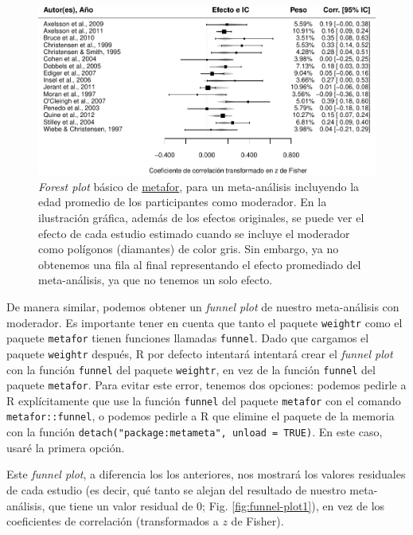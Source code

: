 \documentclass[
  bookmarksnumbered]{article}
\begin{document}
\begin{figure}
\centering
\includegraphics{Meta-analysis_files/figure-latex/for-plot-mod1-1.pdf}
\caption{\label{fig:for-plot-mod1}\emph{Forest plot} básico de \href{https://www.metafor-project.org/doku.php}{metafor}, para un meta-análisis incluyendo la edad promedio de los participantes como moderador. En la ilustración gráfica, además de los efectos originales, se puede ver el efecto de cada estudio estimado cuando se incluye el moderador como polígonos (diamantes) de color gris. Sin embargo, ya no obtenemos una fila al final representando el efecto promediado del meta-análisis, ya que no tenemos un solo efecto.}
\end{figure}

De manera similar, podemos obtener un \emph{funnel plot} de nuestro meta-análisis con moderador. Es importante tener en cuenta que tanto el paquete \texttt{weightr} como el paquete \texttt{metafor} tienen funciones llamadas \texttt{funnel}. Dado que cargamos el paquete \texttt{weightr} después, R por defecto intentará intentará crear el \emph{funnel plot} con la función \texttt{funnel} del paquete \texttt{weightr}, en vez de la función \texttt{funnel} del paquete \texttt{metafor}. Para evitar este error, tenemos dos opciones: podemos pedirle a R explícitamente que use la función \texttt{funnel} del paquete \texttt{metafor} con el comando \texttt{metafor::funnel}, o podemos pedirle a R que elimine el paquete de la memoria con la función \texttt{detach("package:metameta",\ unload\ =\ TRUE)}. En este caso, usaré la primera opción.

Este \emph{funnel plot}, a diferencia los los anteriores, nos mostrará los valores residuales de cada estudio (es decir, qué tanto se alejan del resultado de nuestro meta-análisis, que tiene un valor residual de 0; Fig. \ref{fig:funnel-plot1}), en vez de los coeficientes de correlación (transformados a \(z\) de Fisher).
\end{document}
